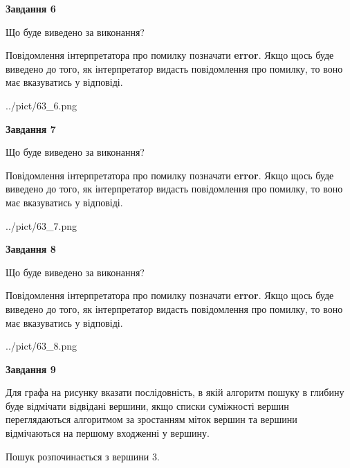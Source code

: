 \documentclass[12pt, ukrainian]{article}
\begin{document}
{\begin {large}
{\begin {center}\textbf{Завдання 6}\end {center}}\par
Що буде виведено за виконання?

Повідомлення інтерпретатора про помилку позначати \textbf{error}.
Якщо щось буде виведено до того, як інтерпретатор видасть повідомлення про помилку, 
то воно має вказуватись у відповіді. \par


\begin{center}
	{../pict/63_6.png}
\end{center}
\newpage

{\begin {center}\textbf{Завдання 7}\end {center}}\par
Що буде виведено за виконання?

Повідомлення інтерпретатора про помилку позначати \textbf{error}.
Якщо щось буде виведено до того, як інтерпретатор видасть повідомлення про помилку, 
то воно має вказуватись у відповіді. \par


\begin{center}
	{../pict/63_7.png}
\end{center}
\newpage

{\begin {center}\textbf{Завдання 8}\end {center}}\par
Що буде виведено за виконання?

Повідомлення інтерпретатора про помилку позначати \textbf{error}.
Якщо щось буде виведено до того, як інтерпретатор видасть повідомлення про помилку, 
то воно має вказуватись у відповіді. \par


\begin{center}
	{../pict/63_8.png}
\end{center}
\newpage

{\begin {center}\textbf{Завдання 9}\end {center}}\par
Для графа на рисунку вказати послідовність, в якій алгоритм пошуку в глибину буде відмічати відвідані вершини, якщо списки суміжності вершин переглядаються алгоритмом за зростанням міток вершин та вершини відмічаються на першому вход\-женні у вершину.\par
Пошук розпочинається з вершини 3.\par


\end{large}}
\end{document}
